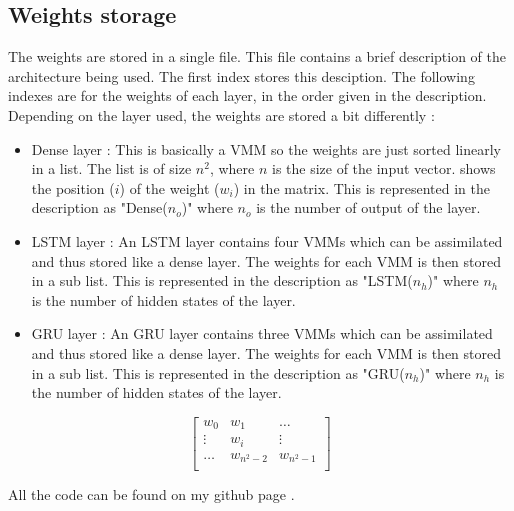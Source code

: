 \subsection{Weights storage}\label{subsec:weiStore}

The weights are stored in a single file. This file contains a brief description of the architecture being used. The first index stores this desciption. The following indexes are for the weights of each layer, in the order given in the description. Depending on the layer used, the weights are stored a bit differently :

\begin{itemize}
  \item Dense layer : This is basically a \ac{VMM} so the weights are just sorted linearly in a list. The list is of size $n^2$, where $n$ is the size of the input vector.  shows the position ($i$) of the weight ($w_i$) in the matrix. This is represented in the description as "Dense($n_o$)" where $n_o$ is the number of output of the layer.
  \item \ac{LSTM} layer : An \ac{LSTM} layer contains four \acp{VMM} which can be assimilated and thus stored like a dense layer. The weights for each \ac{VMM} is then stored in a sub list. This is represented in the description as "LSTM($n_h$)" where $n_h$ is the number of hidden states of the layer.
  \item \ac{GRU} layer : An \ac{GRU} layer contains three \acp{VMM} which can be assimilated and thus stored like a dense layer. The weights for each \ac{VMM} is then stored in a sub list. This is represented in the description as "GRU($n_h$)" where $n_h$ is the number of hidden states of the layer.
\end{itemize}

\begin{equation}\label{mtrx:wei}
  \begin{bmatrix}
    w_{0} & w_{1} & \dots \\
    \vdots & w_i & \vdots \\
    \dots & w_{n^2-2} & w_{n^2-1}\\
  \end{bmatrix}
\end{equation}

All the code can be found on my github page \cite{lstmGen}.
